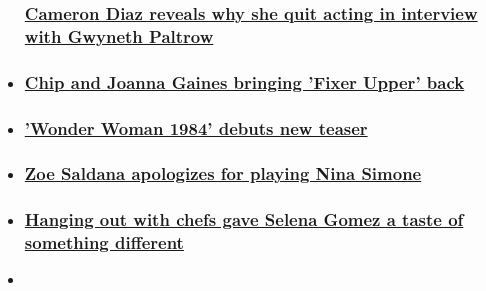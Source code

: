 \begin{itemize}
{  \subsubsection{\texorpdfstring{\href{/2020/08/06/entertainment/cameron-diaz-acting-career-scli-intl/index.html}{Cameron
  Diaz reveals why she quit acting in interview with Gwyneth
  Paltrow}}{Cameron Diaz reveals why she quit acting in interview with Gwyneth Paltrow}}\label{cameron-diaz-reveals-why-she-quit-acting-in-interview-with-gwyneth-paltrow}}
\item
  \hypertarget{chip-and-joanna-gaines-bringing-fixer-upper-back}{%
  \subsubsection{\texorpdfstring{\href{/2020/08/06/entertainment/chip-joanna-gaines-fixer-upper/index.html}{Chip
  and Joanna Gaines bringing 'Fixer Upper'
  back}}{Chip and Joanna Gaines bringing 'Fixer Upper' back}}\label{chip-and-joanna-gaines-bringing-fixer-upper-back}}
\item
  \hypertarget{wonder-woman-1984-debuts-new-teaser}{%
  \subsubsection{\texorpdfstring{\href{/2020/08/06/entertainment/wonder-woman-1984-teaser-kristen-wiig-trnd/index.html}{'Wonder
  Woman 1984' debuts new
  teaser}}{'Wonder Woman 1984' debuts new teaser}}\label{wonder-woman-1984-debuts-new-teaser}}
\item
  \hypertarget{zoe-saldana-apologizes-for-playing-nina-simone-}{%
  \subsubsection{\texorpdfstring{\href{/2020/08/06/entertainment/zoe-saldana-nina-simone-apology-scli-intl/index.html}{Zoe
  Saldana apologizes for playing Nina Simone
  }}{Zoe Saldana apologizes for playing Nina Simone }}\label{zoe-saldana-apologizes-for-playing-nina-simone-}}
\item
  \hypertarget{hanging-out-with-chefs-gave-selena-gomez-a-taste-of-something-different-}{%
  \subsubsection{\texorpdfstring{\href{/2020/08/05/entertainment/selena-gomez-chef/index.html}{Hanging
  out with chefs gave Selena Gomez a taste of something different
  }}{Hanging out with chefs gave Selena Gomez a taste of something different }}\label{hanging-out-with-chefs-gave-selena-gomez-a-taste-of-something-different-}}
\item
  \hypertarget{ren--stimpy-is-getting-a-reboot}{%
}
\end{itemize}
